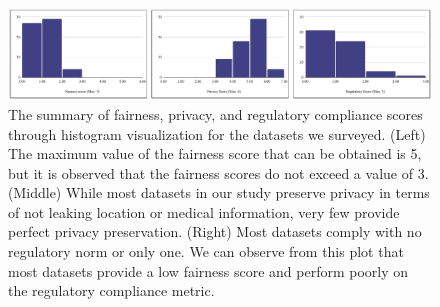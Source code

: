 \documentclass[journal]{IEEEtran}
\begin{document}
\begin{figure}[!]
\centering
\includegraphics[width=\textwidth]{images/barplot_summary2.pdf}
\caption{The summary of fairness, privacy, and regulatory compliance scores through histogram visualization for the datasets we surveyed. (Left) The maximum value of the fairness score that can be obtained is 5, but it is observed that the fairness scores do not exceed a value of 3. (Middle) While most datasets in our study preserve privacy in terms of not leaking location or medical information, very few provide perfect privacy preservation. (Right) Most datasets comply with no regulatory norm or only one. We can observe from this plot that most datasets provide a low fairness score and perform poorly on the regulatory compliance metric.}
\label{fig:barplotsummary}
\end{figure}


\end{document}
